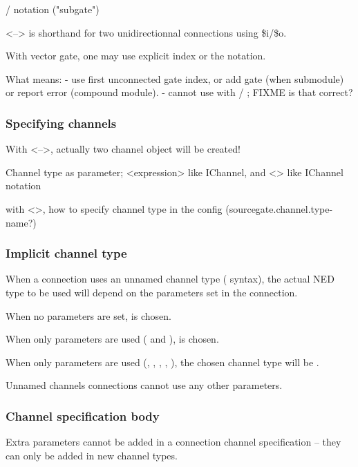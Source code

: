  /  notation ("subgate")

<--> is shorthand for two unidirectionnal connections using \$i/\$o.

With vector gate, one may use explicit index or the  notation.

What \ttt{++} means:
 - use first unconnected gate index, or add gate (when submodule) or report error (compound module).
 - cannot use \ttt{++} with  / ; FIXME is that correct?


\subsubsection{Specifying channels}

With <-->, actually two channel object will be created!

Channel type as parameter; <expression> like IChannel, and <> like IChannel notation

with <>, how to specify channel type in the config (sourcegate.channel.type-name?)



\subsubsection{Implicit channel type}

When a connection uses an unnamed channel type (\ttt{-{}->
\{\ldots\} -{}->} syntax), the actual NED type to be used will depend on the
parameters set in the connection.

When no parameters are set,  is chosen.

When only  parameters are used (
and ),  is chosen.

When only  parameters are used
(, , , , ),
the chosen channel type will be .

Unnamed channels connections cannot use any other parameters.


\subsubsection{Channel specification body}

Extra parameters cannot be added in a connection channel specification --
they can only be added in new channel types.



